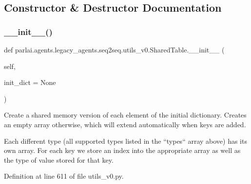 \subsection{Constructor \& Destructor Documentation}
\mbox{\label{classparlai_1_1agents_1_1legacy__agents_1_1seq2seq_1_1utils__v0_1_1SharedTable_a0bb7ef513d5028c6f011cc09c6934dea}} 
\subsubsection{\texorpdfstring{\+\_\+\+\_\+init\+\_\+\+\_\+()}{\_\_init\_\_()}}
{\footnotesize\ttfamily def parlai.\+agents.\+legacy\+\_\+agents.\+seq2seq.\+utils\+\_\+v0.\+Shared\+Table.\+\_\+\+\_\+init\+\_\+\+\_\+ (\begin{DoxyParamCaption}\item[{}]{self,  }\item[{}]{init\+\_\+dict = {\ttfamily None} }\end{DoxyParamCaption})}

\begin{DoxyVerb}Create a shared memory version of each element of the initial dictionary.
Creates an empty array otherwise, which will extend automatically when keys are
added.

Each different type (all supported types listed in the ``types`` array above)
has its own array. For each key we store an index into the appropriate array as
well as the type of value stored for that key.
\end{DoxyVerb}
 

Definition at line 611 of file utils\+\_\+v0.\+py.



